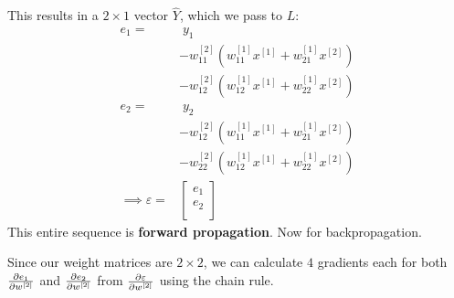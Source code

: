 This results in a $2 \times 1$ vector $\hat{Y}$, which we pass to $L$:
\begin{align*}
    e_1 = & \; y_1 \\
    & - w^{[2]}_{11} \left( w^{[1]}_{11} x^{[1]} + w^{[1]}_{21} x^{[2]} \right) \\
    & - w^{[2]}_{12} \left( w^{[1]}_{12} x^{[1]} + w^{[1]}_{22} x^{[2]} \right) \\
    e_2 = & \; y_2 \\
    & - w^{[2]}_{12} \left( w^{[1]}_{11} x^{[1]} + w^{[1]}_{21} x^{[2]} \right) \\
    & - w^{[2]}_{22} \left( w^{[1]}_{12} x^{[1]} + w^{[1]}_{22} x^{[2]} \right) \\
    \implies \varepsilon = & \left[ \begin{matrix}
        e_1 \\
        e_2 \\
    \end{matrix} \right] 
\end{align*}
This entire sequence is \textbf{forward propagation}. Now for backpropagation.

Since our weight matrices are $2 \times 2$, we can calculate $4$ gradients each for
both $\frac{\partial e_1}{\partial w^{[2]}}$ and $\frac{\partial e_2}{\partial w^{[2]}}$
from $\frac{\partial \varepsilon}{\partial w^{[2]}}$ using the chain rule.